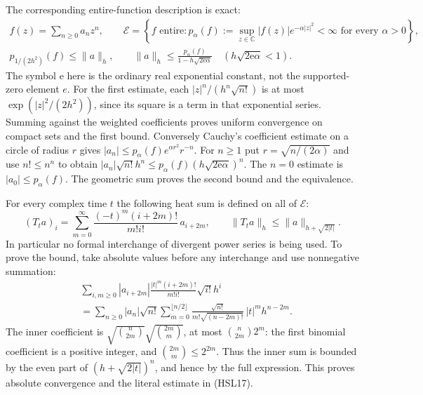 The corresponding entire-function description is exact:
\begin{equation}\tag{HSL16}
 \begin{gathered}
 f(z)=\sum_{n\ge0}a_nz^n,\qquad
 \mathcal E=\left\{f\text{ entire}:
   p_\alpha(f):=\sup_{z\in\mathbb C}
                |f(z)|e^{-\alpha|z|^2}<\infty
                \text{ for every }\alpha>0\right\},\\
 p_{1/(2h^2)}(f)\le\|a\|_h,\qquad
 \|a\|_h\le
       \frac{p_\alpha(f)}{1-h\sqrt{2\mathrm e\alpha}}
       \quad\left(h\sqrt{2\mathrm e\alpha}<1\right).
 \end{gathered}
\end{equation}
The symbol $\mathrm e$ here is the ordinary real exponential
constant, not the supported-zero element $e$.
For the first estimate, each
$|z|^n/(h^n\sqrt{n!})$ is at most
$\exp(|z|^2/(2h^2))$, since its square is a term in that
exponential series. Summing against the weighted coefficients
proves uniform convergence on compact sets and the first bound.
Conversely Cauchy's coefficient estimate on a circle of radius
$r$ gives $|a_n|\le p_\alpha(f)e^{\alpha r^2}r^{-n}$.
For $n\ge1$ put $r=\sqrt{n/(2\alpha)}$ and use
$n!\le n^n$ to obtain
$|a_n|\sqrt{n!}h^n\le
p_\alpha(f)(h\sqrt{2\mathrm e\alpha})^n$.
The $n=0$ estimate is $|a_0|\le p_\alpha(f)$.
The geometric sum proves the second bound and the equivalence.

For every complex time $t$ the following heat sum is defined
on all of $\mathcal E$:
\begin{equation}\tag{HSL17}
 (T_ta)_i=
 \sum_{m=0}^{\infty}
       \frac{(-t)^m(i+2m)!}{m!i!}\,a_{i+2m},\qquad
 \|T_ta\|_h\le\|a\|_{h+\sqrt{2|t|}}.
\end{equation}
In particular no formal interchange of divergent power series
is being used. To prove the bound, take absolute values before
any interchange and use nonnegative summation:
\[
 \begin{split}
 &\sum_{i,m\ge0}
  |a_{i+2m}|\frac{|t|^m(i+2m)!}{m!i!}\sqrt{i!}h^i\\
 &=\sum_{n\ge0}|a_n|\sqrt{n!}
     \sum_{m=0}^{\lfloor n/2\rfloor}
       \frac{\sqrt{n!}}{m!\sqrt{(n-2m)!}}\,
                    |t|^m h^{n-2m}.
 \end{split}
\]
The inner coefficient is
$\sqrt{\binom n{2m}}\sqrt{\binom{2m}m}$, at most
$\binom n{2m}2^m$: the first binomial coefficient is a
positive integer, and $\binom{2m}m\le2^{2m}$.
Thus the inner sum is bounded by the even part of
$(h+\sqrt{2|t|})^n$, and hence by the full expression.
This proves absolute convergence and the literal estimate in
(HSL17).

